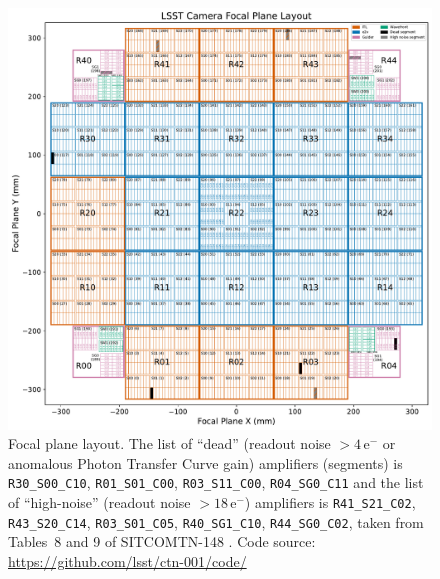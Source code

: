 \documentclass[OPS,lsstdraft,authoryear,toc]{lsstdoc}
\begin{document}
\begin{figure}
  \centering
  \includegraphics[width=\textwidth]{figures/LSSTCam_focal_plane_CTN_001_FIG1.pdf}
  \caption{Focal plane layout. The list of ``dead'' (readout noise $> 4\,\mathrm{e}^{-}$ or anomalous Photon Transfer Curve gain) 
	amplifiers (segments) is {\tt{R30\_S00\_C10}}, {\tt{R01\_S01\_C00}}, {\tt{R03\_S11\_C00}}, {\tt{R04\_SG0\_C11}} 
and the list of ``high-noise'' (readout noise $> 18\,\mathrm{e}^{-}$) amplifiers is 
{{\tt{R41\_S21\_C02}}, {\tt{R43\_S20\_C14}}, {\tt{R03\_S01\_C05}}, {\tt{R40\_SG1\_C10}}, 
	{\tt{R44\_SG0\_C02}}, taken from Tables~8 and 9 of SITCOMTN-148 \citep{utsumi25}. Code source: \url{https://github.com/lsst/ctn-001/code/}}}
  \label{fig:focal_plane_1}
\end{figure}

\clearpage
\end{document}
